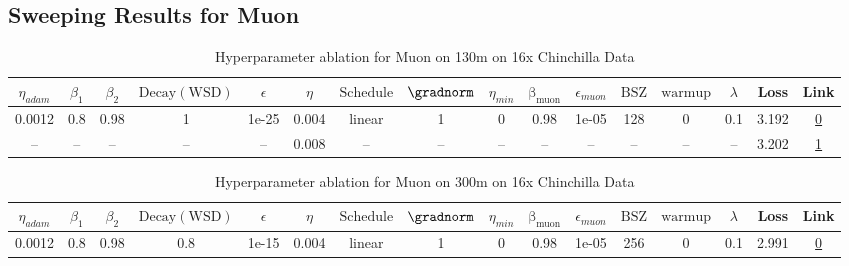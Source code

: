 \subsection{Sweeping Results for Muon}%
\begin{table}[H]
\centering
\caption{Hyperparameter ablation for Muon on 130m on 16x Chinchilla Data}
\label{tab:ablation_muon_130m_on_16x_chinchilla_data}
\begin{tabular}{cccccccccccccccc}
\toprule
$\eta_{adam}$ & $\beta_1$ & $\beta_2$ & $\mathrm{Decay (WSD)}$ & $\epsilon$ & $\eta$ & $\mathrm{Schedule}$ & $\gradnorm$ & $\eta_{min}$ & $\mathrm{\beta_{muon}}$ & $\epsilon_{muon}$ & $\mathrm{BSZ}$ & $\mathrm{warmup}$ & $\lambda$ & Loss & Link \\
\midrule
0.0012 & 0.8 & 0.98 & 1 & 1e-25 & 0.004 & linear & 1 & 0 & 0.98 & 1e-05 & 128 & 0 & 0.1 & 3.192 & \href{https://wandb.ai/stanford-mercury/optimizer-scaling/runs/sweep-130m-42B-muona84ae6lr0.004-wd0.1-minlr0-warmup0-b10.8-b20.-7e0789}{0} \\
\midrule
-- & -- & -- & -- & -- & 0.008 & -- & -- & -- & -- & -- & -- & -- & -- & 3.202 & \href{https://wandb.ai/stanford-mercury/optimizer-scaling/runs/sweep-130m-42B-muoncedd383lr0.008-wd0.1-minlr0-warmup0-b10.8-b20-89555c}{1} \\
\bottomrule
\end{tabular}
\end{table}

\begin{table}[H]
\centering
\caption{Hyperparameter ablation for Muon on 300m on 16x Chinchilla Data}
\label{tab:ablation_muon_300m_on_16x_chinchilla_data}
\begin{tabular}{cccccccccccccccc}
\toprule
$\eta_{adam}$ & $\beta_1$ & $\beta_2$ & $\mathrm{Decay (WSD)}$ & $\epsilon$ & $\eta$ & $\mathrm{Schedule}$ & $\gradnorm$ & $\eta_{min}$ & $\mathrm{\beta_{muon}}$ & $\epsilon_{muon}$ & $\mathrm{BSZ}$ & $\mathrm{warmup}$ & $\lambda$ & Loss & Link \\
\midrule
0.0012 & 0.8 & 0.98 & 0.8 & 1e-15 & 0.004 & linear & 1 & 0 & 0.98 & 1e-05 & 256 & 0 & 0.1 & 2.991 & \href{https://wandb.ai/stanford-mercury/optimizer-scaling/runs/sweep-300m-96B-muonf26f61lr0.004-wd0.1-minlr0-warmup0-b10.8-b20.-ab5ce4}{0} \\
\midrule
\bottomrule
\end{tabular}
\end{table}

